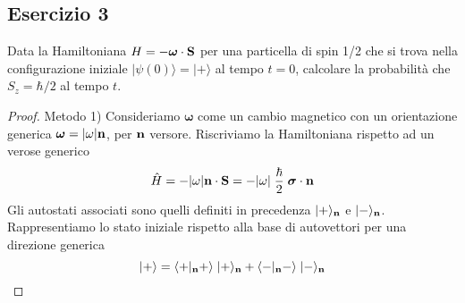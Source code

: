 \subsection{Esercizio 3}
Data la Hamiltoniana $H = - \boldsymbol{\omega} \cdot \bold{S}$ per una particella di spin 1/2 che si trova nella configurazione iniziale $|\psi(0) \rangle = |+ \rangle $ al tempo $t = 0$, calcolare la probabilit\`a che $S_z = \hbar /2$ al tempo $t$.
\begin{proof}
	Metodo 1)
	\newline
	Consideriamo $\boldsymbol{\omega}$ come un cambio magnetico con un orientazione generica $\boldsymbol{\omega} = |\omega|\bold{n}$, per $\bold{n}$ versore. Riscriviamo la Hamiltoniana rispetto ad un verose generico
	\begin{equation*}
		\hat{H} = - |\omega| \bold{n} \cdot \bold{S} = - |\omega| \; \frac{\hbar}{2} \; \boldsymbol{\sigma} \cdot \bold{n}
	\end{equation*}
Gli autostati associati sono quelli definiti in precedenza $|+ \rangle_{\bold{n}}$ e $|- \rangle_{\bold{n}}$. Rappresentiamo lo stato iniziale rispetto alla base di autovettori per una direzione generica
\begin{equation*}
	|+ \rangle = \langle + |_{\bold{n}} + \rangle \;|+ \rangle_{\bold{n}} + \langle -|_{\bold{n}}- \rangle \;|-\rangle_{\bold{n}}
\end{equation*}
\newpage


\end{proof}
